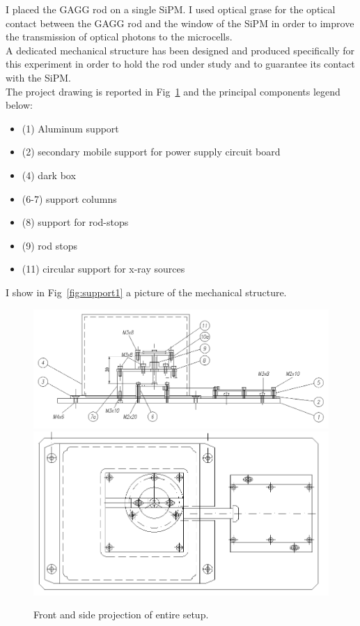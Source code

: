 \documentclass[10pt,a4paper, openany]{book}
\begin{document}
I placed the GAGG rod on a single SiPM. I used optical grase for the optical contact between the GAGG rod and the window of the SiPM in order to improve the transmission of optical photons to the microcells.\\
A dedicated mechanical structure has been designed and produced specifically for this experiment in order to hold the rod under study and to guarantee its contact with the SiPM.\\
The project drawing is reported in Fig~\ref{fig:cad} and the principal components legend below:
\begin{itemize}
\item (1) Aluminum support
\item (2) secondary mobile support for power supply circuit board
\item (4) dark box
\item (6-7) support columns 
\item (8) support for rod-stops
\item (9) rod stops
\item (11) circular support for x-ray sources
\end{itemize}
I show in Fig~\ref{fig:support1} a picture of the mechanical structure.

\newpage
\begin{figure}[!h]
\begin{center}
\includegraphics[scale=0.45]{imm/cad1.png}\\
\includegraphics[scale=0.45]{imm/cad2.png}\\
\end{center}
\caption{Front and side projection of entire setup.}
\label{fig:cad}
\end{figure}
\end{document}
